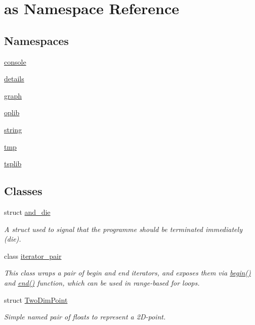 \hypertarget{namespaceas}{}\section{as Namespace Reference}
\label{namespaceas}
\subsection*{Namespaces}
\begin{DoxyCompactItemize}
\item 
 \hyperlink{namespaceas_1_1console}{console}
\item 
 \hyperlink{namespaceas_1_1details}{details}
\item 
 \hyperlink{namespaceas_1_1graph}{graph}
\item 
 \hyperlink{namespaceas_1_1oplib}{oplib}
\item 
 \hyperlink{namespaceas_1_1string}{string}
\item 
 \hyperlink{namespaceas_1_1tmp}{tmp}
\item 
 \hyperlink{namespaceas_1_1tsplib}{tsplib}
\end{DoxyCompactItemize}
\subsection*{Classes}
\begin{DoxyCompactItemize}
\item 
struct \hyperlink{structas_1_1and__die}{and\+\_\+die}
\begin{DoxyCompactList}\small\item\em A struct used to signal that the programme should be terminated immediately (die). \end{DoxyCompactList}\item 
class \hyperlink{classas_1_1iterator__pair}{iterator\+\_\+pair}
\begin{DoxyCompactList}\small\item\em This class wraps a pair of begin and end iterators, and exposes them via \hyperlink{classas_1_1iterator__pair_a88c00afafd5ee4477b7ab2a1a89bb746}{begin()} and \hyperlink{classas_1_1iterator__pair_ae7cef6e91faecd20e6aebd2f21b29b41}{end()} function, which can be used in range-\/based for loops. \end{DoxyCompactList}\item 
struct \hyperlink{structas_1_1TwoDimPoint}{Two\+Dim\+Point}
\begin{DoxyCompactList}\small\item\em Simple named pair of floats to represent a 2\+D-\/point. \end{DoxyCompactList}\end{DoxyCompactItemize}
